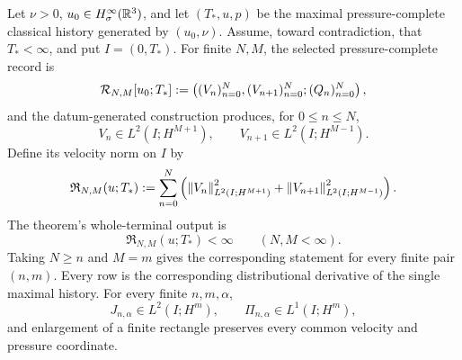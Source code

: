 \begin{theorem}
\label{u:thm:datum-finite-blocks}
Let \(\nu>0\), \(u_0\in H^\infty_\sigma(\mathbb R^3)\), and let
\((T_*,u,p)\) be the maximal pressure-complete classical history generated
by \((u_0,\nu)\).  Assume, toward contradiction, that \(T_*<\infty\), and put
\(I=(0,T_*)\).  For finite \(N,M\), the selected pressure-complete record is
\begin{equation}
 \mathcal R_{N,M}[u_0;T_*]
 :=\left((V_n)_{n=0}^{N},(V_{n+1})_{n=0}^{N};(Q_n)_{n=0}^{N}\right),
 \label{u:eq:independent-datum-rectangle-record}
\end{equation}
and the datum-generated construction produces, for \(0\le n\le N\),
\begin{equation}
 V_n\in L^2(I;H^{M+1}),\qquad
 V_{n+1}\in L^2(I;H^{M-1}).
 \label{u:eq:independent-adjacent-finite-rows}
\end{equation}
Define its velocity norm on \(I\) by
\begin{equation}
 \mathfrak R_{N,M}(u;T_*)
 :=\sum_{n=0}^{N}\left(
 \left\lVert V_n\right\rVert_{L^2(I;H^{M+1})}^2
 +\left\lVert V_{n+1}\right\rVert_{L^2(I;H^{M-1})}^2
 \right).
 \label{u:eq:independent-datum-block-output}
\end{equation}
The theorem's whole-terminal output is
\begin{equation}
 \mathfrak R_{N,M}(u;T_*)<\infty
 \qquad(N,M<\infty).
 \label{u:eq:datum-whole-terminal-producer}
\end{equation}
Taking \(N\ge n\) and \(M=m\) gives the corresponding statement for every
finite pair \((n,m)\).
Every row is the corresponding distributional derivative of the single
maximal history.  For every finite \(n,m,\alpha\),
\[
 J_{n,\alpha}\in L^2(I;H^m),
 \qquad \Pi_{n,\alpha}\in L^1(I;H^m),
\]
and enlargement of a finite rectangle preserves every common velocity and
pressure coordinate.
\end{theorem}

